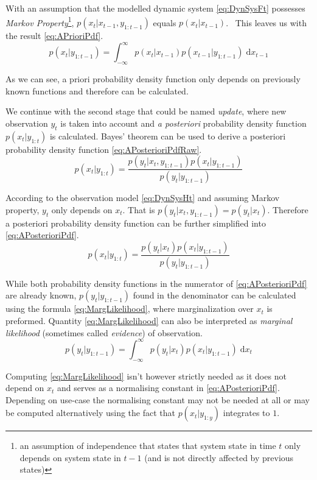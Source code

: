 \documentclass[a4paper,12pt,oneside]{report}
\newcommand{\pdf}{probability density function}
\newcommand{\pdfs}{probability density functions}
\newcommand{\dx}{\mathrm{d}x}
\begin{document}
With an assumption that the modelled dynamic system \eqref{eq:DynSysFt} possesses \emph{Markov
Property}\footnote{an assumption of independence that states that system state in time \(t\) only
depends on system state in \(t-1\) (and is not directly affected by previous states)},
\(p(x_t | x_{t-1}, y_{1:t-1})\) equals \(p(x_t | x_{t-1})\).~\cite{AruMasGor:02}
This leaves us with the result \eqref{eq:APrioriPdf}.
\begin{equation} \label{eq:APrioriPdf}
	p(x_t | y_{1:t-1}) = \int_{-\infty}^{\infty} p(x_t | x_{t-1}) p(x_{t-1} | y_{1:t-1}) \; \dx_{t-1}
\end{equation}

As we can see, a priori {\pdf} only depends on previously known functions and therefore can be
calculated.

We continue with the second stage that could be named \emph{update}, where new observation \(y_t\) is taken into
account and \emph{a posteriori} {\pdf} \(p(x_t | y_{1:t})\) is calculated. Bayes' theorem can be used
to derive a posteriori {\pdf} \eqref{eq:APosterioriPdfRaw}.
\begin{equation} \label{eq:APosterioriPdfRaw}
	p(x_t | y_{1:t}) = \frac{p(y_t | x_t, y_{1:t-1}) p(x_t | y_{1:t-1})}{p(y_t | y_{1:t-1})}
\end{equation}

According to the observation model \eqref{eq:DynSysHt} and assuming Markov property, \(y_t\) only
depends on \(x_t\). That is \(p(y_t | x_t, y_{1:t-1}) = p(y_t | x_t)\). Therefore a posteriori
{\pdf} can be further simplified into \eqref{eq:APosterioriPdf}.
\begin{equation} \label{eq:APosterioriPdf}
	p(x_t | y_{1:t}) = \frac{p(y_t | x_t) p(x_t | y_{1:t-1})}{p(y_t | y_{1:t-1})}
\end{equation}

While both {\pdfs} in the numerator of \eqref{eq:APosterioriPdf} are already known, \(p(y_t|y_{1:t-1})\)
found in the denominator can be calculated using the formula \eqref{eq:MargLikelihood}, where
marginalization over \(x_t\) is preformed. Quantity \eqref{eq:MargLikelihood} can also be interpreted as
\emph{marginal likelihood} (sometimes called \emph{evidence}) of observation.~\cite{Smi:10}
\begin{equation} \label{eq:MargLikelihood}
	p(y_t | y_{1:t-1}) = \int_{-\infty}^{\infty} p(y_t | x_t) p(x_t | y_{1:t-1}) \; \dx_{t}
\end{equation}

Computing \eqref{eq:MargLikelihood} isn't however strictly needed as it does not depend on \(x_t\) and
serves as a normalising constant in \eqref{eq:APosterioriPdf}. Depending on use-case the normalising
constant may not be needed at all or may be computed alternatively using the fact that \(p(x_t | y_{1:y})\)
integrates to \(1\).
\end{document}
